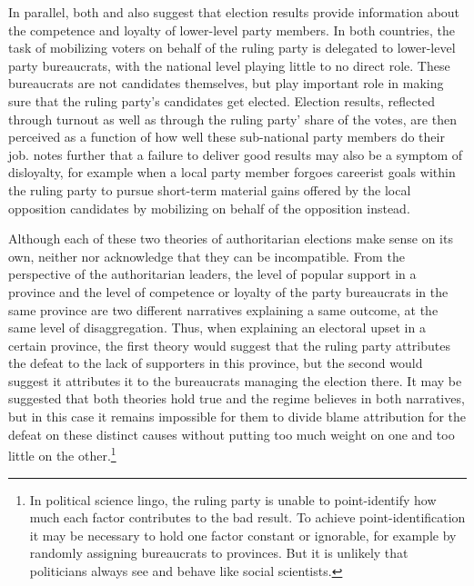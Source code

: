 \documentclass[12pt]{article}\usepackage[]{graphicx}\usepackage[]{color}
\newcommand{\1}{\mathbbm{1}}
\begin{document}
In parallel, both \cite{Magaloni2006} and \cite{Blaydes2008} also suggest that election results provide information about the competence and loyalty of lower-level party members. In both countries, the task of mobilizing voters on behalf of the ruling party is delegated to lower-level party bureaucrats, with the national level playing little to no direct role. These bureaucrats are not candidates themselves, but play important role in making sure that the ruling party’s candidates get elected. Election results, reflected through turnout as well as through the ruling party' share of the votes, are then perceived as a function of how well these sub-national party members do their job. \cite{Blaydes2008} notes further that a failure to deliver good results may also be a symptom of disloyalty, for example when a local party member forgoes careerist goals within the ruling party to pursue short-term material gains offered by the local opposition candidates by mobilizing on behalf of the opposition instead.

Although each of these two theories of authoritarian elections make sense on its own, neither \cite{Magaloni2006} nor \cite{Blaydes2008} acknowledge that they can be incompatible. From the perspective of the authoritarian leaders, the level of popular support in a province and the level of competence or loyalty of the party bureaucrats in the same province are two different narratives explaining a same outcome, at the same level of disaggregation. Thus, when explaining an electoral upset in a certain province, the first theory would suggest that the ruling party attributes the defeat to the lack of supporters in this province, but the second would suggest it attributes it to the bureaucrats managing the election there. It may be suggested that both theories hold true and the regime believes in both narratives, but in this case it remains impossible for them to divide blame attribution for the defeat on these distinct causes without putting too much weight on one and too little on the other.\footnote{In political science lingo, the ruling party is unable to point-identify how much each factor contributes to the bad result. To achieve point-identification it may be necessary to hold one factor constant or ignorable, for example by randomly assigning bureaucrats to provinces. But it is unlikely that politicians always see and behave like social scientists.} 
\end{document}
